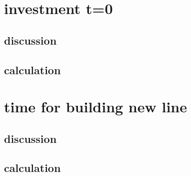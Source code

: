 \documentclass{article}
\begin{document}
\section{investment t=0}
\subsection{discussion}
\subsection{calculation}
\section{time for building new line}
\subsection{discussion}
\subsection{calculation}
\end{document}
